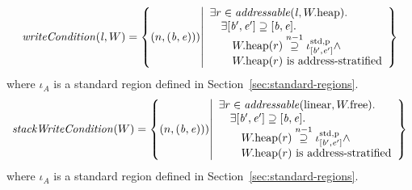 \documentclass[a4paper]{article}
\begin{document}
\[
  \writeCond{\lin,W} = \left\{ \npair{(\baddr,\eaddr)}) \middle| 
    \begin{array}{l}
      \exists r \in \addressable{\lin, \pwheap} \ldotp \\
      \quad \exists [\baddr',\eaddr'] \supseteq [\baddr,\eaddr] \ldotp \\
      \qquad \pwheap(r) \nsupeq[n-1] \stdreg{[\baddr',\eaddr']}{\pur} \wedge \\
      \qquad \pwheap(r) \text{ is address-stratified}
    \end{array}
  \right\}
\]
where $\iota_A$ is a standard region defined in Section~\ref{sec:standard-regions}.
\[
  \stackWriteCond{W} = \left\{ \npair{(\baddr,\eaddr)}) \middle| 
    \begin{array}{l}
      \exists r \in \addressable{\linear, \pwfree} \ldotp \\
      \quad \exists [\baddr',\eaddr'] \supseteq [\baddr,\eaddr] \ldotp \\
      \qquad \pwheap(r) \nsupeq[n-1] \stdreg{[\baddr',\eaddr']}{\pur} \wedge \\
      \qquad \pwheap(r) \text{ is address-stratified}
    \end{array}
  \right\}
\]
where $\iota_A$ is a standard region defined in Section~\ref{sec:standard-regions}.

\end{document}
